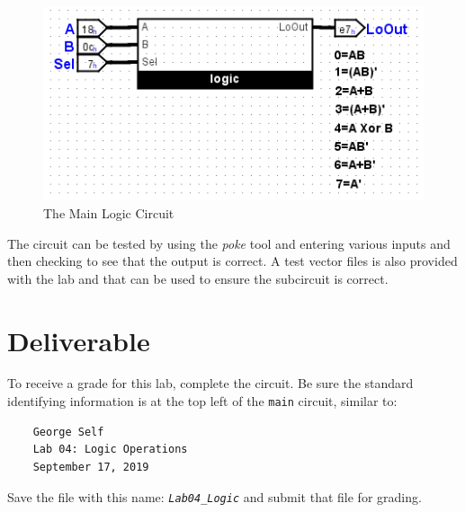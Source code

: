\begin{figure}[H]
	\centering
	\includegraphics[width=\maxwidth{.95\linewidth}]{gfx/logic-01}
	\caption{The Main Logic Circuit}
	\label{fig:logic-01}
\end{figure}

The circuit can be tested by using the \textit{poke} tool and entering various inputs and then checking to see that the output is correct. A test vector files is also provided with the lab and that can be used to ensure the subcircuit is correct.

\section{Deliverable}

To receive a grade for this lab, complete the circuit. Be sure the standard identifying information is at the top left of the \lstinline[columns=fixed]|main| circuit, similar to: 

\bigskip
\begin{minipage}{\linewidth}
	\begin{verbatim}
	George Self
	Lab 04: Logic Operations
	September 17, 2019
	\end{verbatim}
\end{minipage}
\bigskip

Save the file with this name: \emph{\texttt{Lab04\_Logic}} and submit that file for grading.


